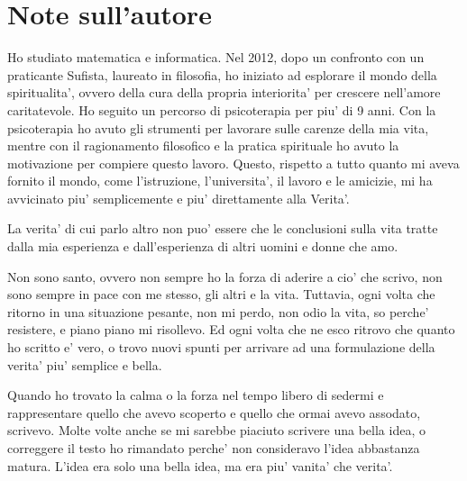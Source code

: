 
\chapter{Note sull'autore}

Ho studiato matematica e informatica. Nel 2012, dopo un confronto con un praticante Sufista, laureato in filosofia, ho iniziato ad esplorare il mondo della spiritualita', ovvero della cura della propria interiorita' per crescere nell'amore caritatevole. Ho seguito un percorso di psicoterapia per piu' di 9 anni. Con la psicoterapia ho avuto gli strumenti per lavorare sulle carenze della mia vita, mentre con il ragionamento filosofico e la pratica spirituale ho avuto la motivazione per compiere questo lavoro. Questo, rispetto a tutto quanto mi aveva fornito il mondo, come l'istruzione, l'universita', il lavoro e le amicizie, mi ha avvicinato piu' semplicemente e piu' direttamente alla Verita'.

La verita' di cui parlo altro non puo' essere che le conclusioni sulla vita tratte dalla mia esperienza e dall'esperienza di altri uomini e donne che amo.

Non sono santo, ovvero non sempre ho la forza di aderire a cio' che scrivo, non sono sempre in pace con me stesso, gli altri e la vita. Tuttavia, ogni volta che ritorno in una situazione pesante, non mi perdo, non odio la vita, so perche' resistere, e piano piano mi risollevo. Ed ogni volta che ne esco ritrovo che quanto ho scritto e' vero, o trovo nuovi spunti per arrivare ad una formulazione della verita' piu' semplice e bella. 

Quando ho trovato la calma o la forza nel tempo libero di sedermi e rappresentare quello che avevo scoperto e quello che ormai avevo assodato, scrivevo. Molte volte anche se mi sarebbe piaciuto scrivere una bella idea, o correggere il testo ho rimandato perche' non consideravo l'idea abbastanza matura. L'idea era solo una bella idea, ma era piu' vanita' che verita'. 

